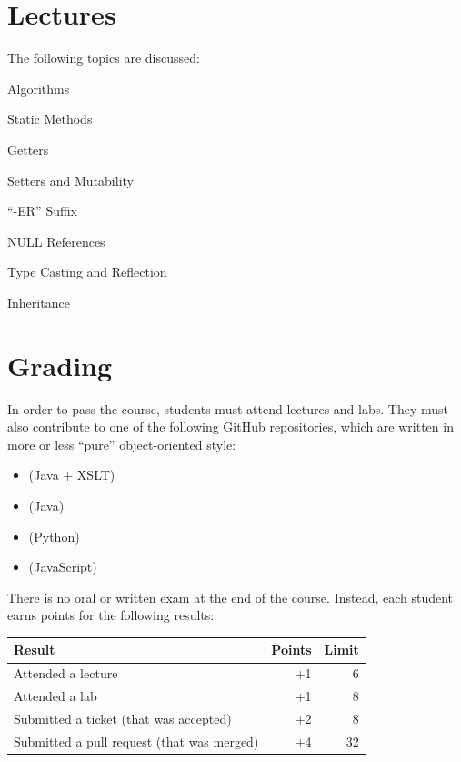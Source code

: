 \documentclass[nobrand,anonymous,nodate,nosecurity]{huawei}
\begin{document}
\newpage
\section*{Lectures}

The following topics are discussed:

\begin{lectures}
\item Algorithms
\item Static Methods
\item Getters
\item Setters and Mutability
\item ``-ER'' Suffix
\item NULL References
\item Type Casting and Reflection
\item Inheritance
\end{lectures}

\newpage
\section*{Grading}

In order to pass the course, students must attend lectures and labs.
They must also contribute to one of the following GitHub repositories, which are written in more or less ``pure'' object-oriented style:

\begin{itemize}
    \item \href{https://github.com/objectionary/eo}{} (Java + XSLT)
    \item \href{https://github.com/yegor256/takes}{} (Java)
    \item \href{https://github.com/cqfn/aibolit}{} (Python)
    \item \href{https://github.com/objectionary/eoc}{} (JavaScript)
\end{itemize}

There is no oral or written exam at the end of the course.
Instead, each student earns points for the following results:

\renewcommand{\arraystretch}{1}
\begin{tabular}{lrr}
\toprule
Result & Points & Limit \\
\midrule
Attended a lecture & +1 & 6 \\
Attended a lab & +1 & 8 \\
Submitted a ticket (that was accepted) & +2 & 8 \\
Submitted a pull request (that was merged) & +4 & 32 \\
\bottomrule
\end{tabular}
\end{document}
